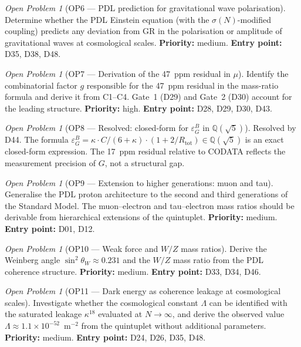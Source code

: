 \documentclass[11pt,a4paper]{article}
\theoremstyle{plain}
\theoremstyle{definition}
\theoremstyle{remark}
\newtheorem{openproblem}[theorem]{Open Problem}
\newcommand{\Rtot}{R_{\mathrm{tot}}}
\newcommand{\sigmaN}{\sigma(N)}
\newcommand{\epsGeomB}{\varepsilon_G^B}
\begin{document}
\begin{openproblem}[OP6 --- PDL prediction for gravitational wave polarisation]
\label{op:GW}
Determine whether the PDL Einstein equation (with the $\sigmaN$-modified coupling) predicts any deviation from GR in the polarisation or amplitude of gravitational waves at cosmological scales. \textbf{Priority:} medium. \textbf{Entry point:} D35, D38, D48.
\end{openproblem}

\begin{openproblem}[OP7 --- Derivation of the 47~ppm residual in $\mu$]
\label{op:residual}
Identify the combinatorial factor $g$ responsible for the 47~ppm residual in the mass-ratio formula and derive it from C1--C4. Gate~1 (D29) and Gate~2 (D30) account for the leading structure. \textbf{Priority:} high. \textbf{Entry point:} D28, D29, D30, D43.
\end{openproblem}

\begin{openproblem}[OP8 --- Resolved: closed-form for $\epsGeomB$ in $\mathbb{Q}(\sqrt{5})$]
\label{op:epsGeomB}
\textcolor{proofblue}{Resolved by D44.} The formula $\epsGeomB = \kappa \cdot C/(6+\kappa)\cdot(1+2/\Rtot) \in \mathbb{Q}(\sqrt{5})$ is an exact closed-form expression. The 17~ppm residual relative to CODATA reflects the measurement precision of $G$, not a structural gap.
\end{openproblem}

\begin{openproblem}[OP9 --- Extension to higher generations: muon and tau]
\label{op:generations}
Generalise the PDL proton architecture to the second and third generations of the Standard Model. The muon--electron and tau--electron mass ratios should be derivable from hierarchical extensions of the quintuplet. \textbf{Priority:} medium. \textbf{Entry point:} D01, D12.
\end{openproblem}

\begin{openproblem}[OP10 --- Weak force and $W/Z$ mass ratios]
\label{op:weak}
Derive the Weinberg angle $\sin^2\theta_W\approx 0.231$ and the $W/Z$ mass ratio from the PDL coherence structure. \textbf{Priority:} medium. \textbf{Entry point:} D33, D34, D46.
\end{openproblem}

\begin{openproblem}[OP11 --- Dark energy as coherence leakage at cosmological scales]
\label{op:darkenergy}
Investigate whether the cosmological constant $\Lambda$ can be identified with the saturated leakage $\kappa^{18}$ evaluated at $N\to\infty$, and derive the observed value $\Lambda\approx 1.1\times10^{-52}$~m$^{-2}$ from the quintuplet without additional parameters. \textbf{Priority:} medium. \textbf{Entry point:} D24, D26, D35, D48.
\end{openproblem}
\end{document}
